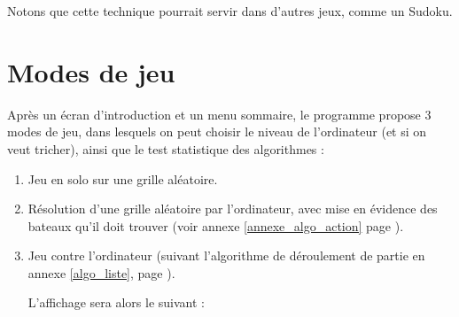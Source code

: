 \medskip

Notons que cette technique pourrait servir dans d'autres jeux, comme un Sudoku.


\newpage
\section{Modes de jeu}
Après un écran d'introduction et un menu sommaire, le programme propose 3 modes de jeu, dans lesquels on peut choisir le niveau de l'ordinateur (et si on veut tricher), ainsi que le test statistique des algorithmes :
\begin{enumerate}
\item Jeu en solo sur une grille aléatoire.
\item Résolution d'une grille aléatoire par l'ordinateur, avec mise en évidence des bateaux qu'il doit trouver (voir annexe \ref{annexe_algo_action} page \pageref{annexe_algo_action}).
\item Jeu contre l'ordinateur (suivant l'algorithme de déroulement de partie en annexe \ref{algo_liste}, page \pageref{algo_partie}).

L'affichage sera alors le suivant :


\end{enumerate}
